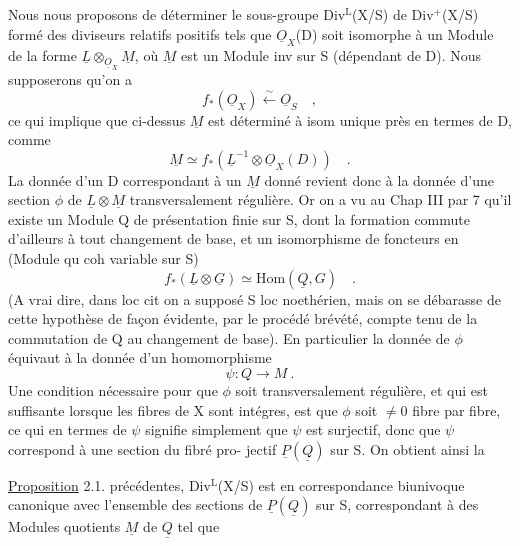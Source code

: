 
Nous nous proposons de déterminer le sous-groupe Div$^{\mathrm{L}}$(X/S) de Div$^{+}$(X/S)
formé des diviseurs relatifs positifs tels que $\underline{O}_X$(D) soit isomorphe à
un Module de la forme $\underline{L}\otimes_{\underline{O}_X}\underline{M}$, où $\underline{M}$ est un Module inv sur S (dépendant de
D). Nous supposerons qu'on a
\[ f_{*}(\underline{O}_X)\overset{\sim}{\longleftarrow}\underline{O}_S \quad , \]
ce qui implique que ci-dessus $\underline{M}$ est déterminé à isom unique près en termes
de D, comme
\[ \underline{M}\simeq f_{*}(\underline{L}^{-1}\otimes\underline{O}_X(D)) \quad . \]
La donnée d'un D correspondant à un $\underline{M}$ donné revient donc à la donnée
d'une section $\phi$ de $\underline{L}\otimes\underline{M}$ transversalement régulière. Or on a vu au
Chap III par 7  qu'il  existe un Module Q de
présentation finie sur S, dont la formation commute d'ailleurs à tout
changement de base, et un isomorphisme de foncteurs en  (Module qu coh
variable sur S)
\[ f_{*}(\underline{L}\otimes\underline{G})\simeq \mathrm{Hom}(\underline{Q},G) \quad . \]
(A vrai dire, dans loc cit on a supposé S loc noethérien, mais on se
débarasse de cette hypothèse de façon évidente, par le procédé brévété,
compte tenu de la commutation de Q au changement de base). En particulier
la donnée de $\phi$ équivaut à  la donnée d'un homomorphisme
\[ \psi : Q \longrightarrow M \ . \]
Une condition nécessaire pour que $\phi$ soit transversalement régulière, et
qui est suffisante lorsque les fibres de X sont intégres, est que $\phi$ soit
$\neq 0$  fibre par fibre, ce qui en termes de $\psi$ signifie simplement que
$\psi$ est surjectif, donc que  $\psi$ correspond à une section du fibré pro-%
jectif $\underline{P}(\underline{Q})$ sur S. On obtient ainsi la

\uline{Proposition} 2.1.   précédentes, Div$^{\mathrm{L}}$(X/S) est
en correspondance biunivoque canonique avec l'ensemble des  sections
de $\underline{P}(\underline{Q})$ sur S, correspondant à des Modules quotients $\underline{M}$ de $\underline{Q}$ tel que

